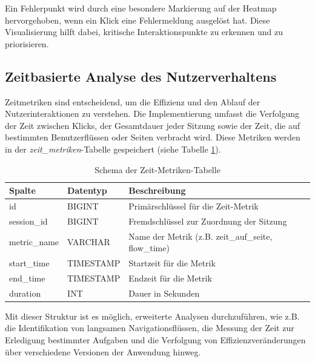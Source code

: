 \documentclass[12pt,oneside]{article}
\begin{document}
Ein Fehlerpunkt wird durch eine besondere Markierung auf der Heatmap hervorgehoben, wenn ein Klick eine Fehlermeldung ausgelöst hat. Diese Visualisierung hilft dabei, kritische Interaktionspunkte zu erkennen und zu priorisieren.

\subsection{Zeitbasierte Analyse des Nutzerverhaltens}
Zeitmetriken sind entscheidend, um die Effizienz und den Ablauf der Nutzerinteraktionen zu verstehen. Die Implementierung umfasst die Verfolgung der Zeit zwischen Klicks, der Gesamtdauer jeder Sitzung sowie der Zeit, die auf bestimmten Benutzerflüssen oder Seiten verbracht wird. Diese Metriken werden in der \textit{zeit\_metriken}-Tabelle gespeichert (siehe Tabelle \ref{tab:time_metrics}).

\begin{table}[H]
\centering
\caption{Schema der Zeit-Metriken-Tabelle}
\label{tab:time_metrics}
\begin{tabular}{|l|l|p{10cm}|}
\hline
\textbf{Spalte} & \textbf{Datentyp} & \textbf{Beschreibung} \\ \hline
id & BIGINT & Primärschlüssel für die Zeit-Metrik \\ \hline
session\_id & BIGINT & Fremdschlüssel zur Zuordnung der Sitzung \\ \hline
metric\_name & VARCHAR & Name der Metrik (z.B. zeit\_auf\_seite, flow\_time) \\ \hline
start\_time & TIMESTAMP & Startzeit für die Metrik \\ \hline
end\_time & TIMESTAMP & Endzeit für die Metrik \\ \hline
duration & INT & Dauer in Sekunden \\ \hline
\end{tabular}
\end{table}

Mit dieser Struktur ist es möglich, erweiterte Analysen durchzuführen, wie z.B. die Identifikation von langsamen Navigationsflüssen, die Messung der Zeit zur Erledigung bestimmter Aufgaben und die Verfolgung von Effizienzveränderungen über verschiedene Versionen der Anwendung hinweg.
\end{document}
